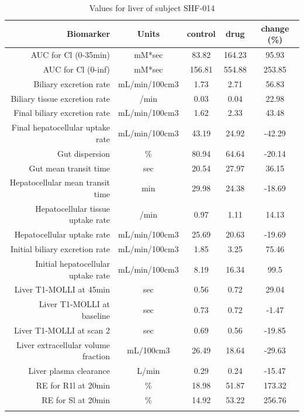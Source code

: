 \documentclass{epflreport}%
\begin{document}
%
\clearpage%
\begin{longtable}{rcccc}%
\hline%
Biomarker&Units&control&drug&change (\%)\\%
\hline%
AUC for Cl (0{-}35min)&mM*sec&83.82&164.23&95.93\\%
AUC for Cl (0{-}inf)&mM*sec&156.81&554.88&253.85\\%
Biliary excretion rate&mL/min/100cm3&1.73&2.71&56.83\\%
Biliary tissue excretion rate&/min&0.03&0.04&22.98\\%
Final biliary excretion rate&mL/min/100cm3&1.62&2.33&43.48\\%
Final hepatocellular uptake rate&mL/min/100cm3&43.19&24.92&{-}42.29\\%
Gut dispersion&\%&80.94&64.64&{-}20.14\\%
Gut mean transit time&sec&20.54&27.97&36.15\\%
Hepatocellular mean transit time&min&29.98&24.38&{-}18.69\\%
Hepatocellular tissue uptake rate&/min&0.97&1.11&14.13\\%
Hepatocellular uptake rate&mL/min/100cm3&25.69&20.63&{-}19.69\\%
Initial biliary excretion rate&mL/min/100cm3&1.85&3.25&75.46\\%
Initial hepatocellular uptake rate&mL/min/100cm3&8.19&16.34&99.5\\%
Liver T1{-}MOLLI at 45min&sec&0.56&0.72&29.04\\%
Liver T1{-}MOLLI at baseline&sec&0.73&0.72&{-}1.47\\%
Liver T1{-}MOLLI at scan 2&sec&0.69&0.56&{-}19.85\\%
Liver extracellular volume fraction&mL/100cm3&26.49&18.64&{-}29.63\\%
Liver plasma clearance&L/min&0.29&0.24&{-}15.47\\%
RE for R1l at 20min&\%&18.98&51.87&173.32\\%
RE for Sl at 20min&\%&14.92&53.22&256.76\\%
\hline%
\caption{Values for liver of subject SHF-014} \\%
\end{longtable}%
\end{document}
